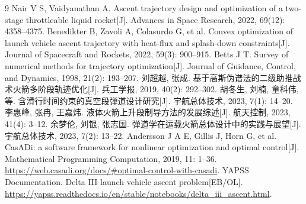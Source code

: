 \documentclass[withoutpreface,bwprint]{cumcmthesis}
\begin{document}
\begin{thebibliography}{9}%
Nair V S, Vaidyanathan A. Ascent trajectory design and optimization of a two-stage throttleable liquid rocket[J]. Advances in Space Research, 2022, 69(12): 4358--4375.
Benedikter B, Zavoli A, Colasurdo G, et al. Convex optimization of launch vehicle ascent trajectory with heat-flux and splash-down constraints[J]. Journal of Spacecraft and Rockets, 2022, 59(3): 900--915.
Betts J T. Survey of numerical methods for trajectory optimization[J]. Journal of Guidance, Control, and Dynamics, 1998, 21(2): 193--207.
刘超越, 张成. 基于高斯伪谱法的二级助推战术火箭多阶段轨迹优化[J]. 兵工学报, 2019, 40(2): 292--302.
胡冬生, 刘楠, 童科伟, 等. 含滑行时间约束的真空段弹道设计研究[J]. 宇航总体技术, 2023, 7(1): 14--20.
李惠峰, 张冉, 王嘉炜. 液体火箭上升段制导方法的发展综述[J]. 航天控制, 2023, 41(4): 3--12.
余梦伦, 刘银, 张志国. 弹道学在运载火箭总体设计中的实践与展望[J]. 宇航总体技术, 2023, 7(2): 13--22.
Andersson J A E, Gillis J, Horn G, et al. CasADi: a software framework for nonlinear optimization and optimal control[J]. Mathematical Programming Computation, 2019, 11: 1--36. \url{https://web.casadi.org/docs/#optimal-control-with-casadi}.
YAPSS Documentation. Delta III launch vehicle ascent problem[EB/OL]. \url{https://yapss.readthedocs.io/en/stable/notebooks/delta_iii_ascent.html}.
\end{thebibliography}
\end{document}
